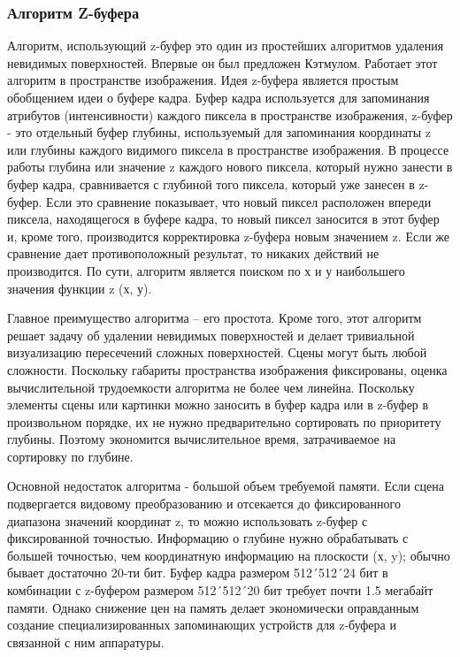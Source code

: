 \subsubsection{Алгоритм Z-буфера}
\label{subsubsection:Zbuff}

\hspace{1.25cm}
Алгоритм, использующий z-буфер это один из простейших алгоритмов удаления невидимых поверхностей. Впервые он был предложен Кэтмулом. Работает этот алгоритм в пространстве изображения. Идея z-буфера является простым обобщением идеи о буфере кадра. Буфер кадра используется для запоминания атрибутов (интенсивности) каждого пиксела в пространстве изображения, z-буфер - это отдельный буфер глубины, используемый для запоминания координаты z или глубины каждого видимого пиксела в пространстве изображения. В процессе работы глубина или значение z каждого нового пиксела, который нужно занести в буфер кадра, сравнивается с глубиной того пиксела, который уже занесен в z-буфер. Если это сравнение показывает, что новый пиксел расположен впереди пиксела, находящегося в буфере кадра, то новый пиксел заносится в этот буфер и, кроме того, производится корректировка z-буфера новым значением z. Если же сравнение дает противоположный результат, то никаких действий не производится. По сути, алгоритм является поиском по х и у наибольшего значения функции z (х, у).

Главное преимущество алгоритма – его простота. Кроме того, этот алгоритм решает задачу об удалении невидимых поверхностей и делает тривиальной визуализацию пересечений сложных поверхностей. Сцены могут быть любой сложности. Поскольку габариты пространства изображения фиксированы, оценка вычислительной трудоемкости алгоритма не более чем линейна. Поскольку элементы сцены или картинки можно заносить в буфер кадра или в z-буфер в произвольном порядке, их не нужно предварительно сортировать по приоритету глубины. Поэтому экономится вычислительное время, затрачиваемое на сортировку по глубине.

Основной недостаток алгоритма - большой объем требуемой памяти. Если сцена подвергается видовому преобразованию и отсекается до фиксированного диапазона значений координат z, то можно использовать z-буфер с фиксированной точностью. Информацию о глубине нужно обрабатывать с большей точностью, чем координатную информацию на плоскости (х, y); обычно бывает достаточно 20-ти бит. Буфер кадра размером 512´512´24 бит в комбинации с z-буфером размером 512´512´20 бит требует почти 1.5 мегабайт памяти. Однако снижение цен на память делает экономически оправданным создание специализированных запоминающих устройств для z-буфера и связанной с ним аппаратуры.

